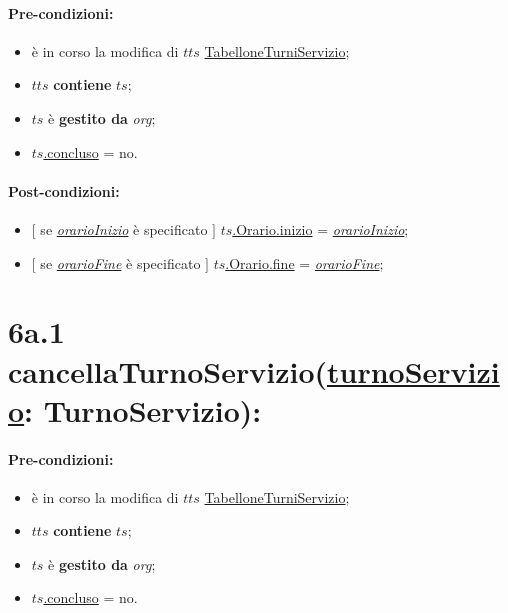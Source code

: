 \paragraph{Pre-condizioni:}
\begin{itemize}
 \item è in corso la modifica di $tts$ \underline{TabelloneTurniServizio};
    \item $tts$ \textbf{contiene} $ts$;
   \item $ts$ è \textbf{gestito da} {\textit{org}};
   \item \underline{$ts$.concluso} = no.
\end{itemize}

\paragraph{Post-condizioni:}

\begin{itemize}
    \item $[$ se \underline{\textit{orarioInizio}} è specificato $]$ \underline{$ts$.Orario.inizio} = \underline{\textit{orarioInizio}};
    \item $[$ se \underline{\textit{orarioFine}} è specificato $]$ \underline{$ts$.Orario.fine} = \underline{\textit{orarioFine}};
\end{itemize}

\section*{6a.1 cancellaTurnoServizio(\underline{turnoServizio}: TurnoServizio):}

\paragraph{Pre-condizioni:}
\begin{itemize}
 \item è in corso la modifica di $tts$ \underline{TabelloneTurniServizio};
    \item $tts$ \textbf{contiene} $ts$;
   \item $ts$ è \textbf{gestito da} \textit{org};
   \item \underline{$ts$.concluso} = no.
\end{itemize}

